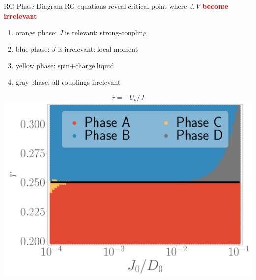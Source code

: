 \documentclass[10pt,aspectratio=169]{beamer}
\newcommand{\focus}[1]{\textcolor{red}{\bf{#1}}}
\begin{document}
\begin{frame}{RG Phase Diagram}
RG equations reveal critical point where \(J,V\) \focus{become irrelevant}\\[10pt]

\hspace*{-20pt}
\begin{minipage}{0.52\textwidth}
\begin{enumerate}
	\item orange phase: \(J\) is relevant: strong-coupling\\[20pt]
	\item blue phase: \(J\) is irrelevant: local moment\\[20pt]
	\item yellow phase: spin+charge liquid\\[20pt]
	\item gray phase: all couplings irrelevant
\end{enumerate}
\end{minipage}
\begin{minipage}{0.5\textwidth}
	\[r = -U_b/J\]
	\includegraphics[width=\textwidth]{phase-map-MIT.pdf}
\end{minipage}

\end{frame}
\end{document}
